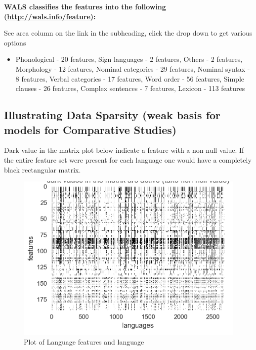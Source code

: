 \newpage

\textbf{WALS classifies the features into the following (\url{http://wals.info/feature}):}

See area column on the link in the subheading, click the drop down to get various options

\begin{itemize}
\item Phonological - 20 features, Sign languages - 2 features, Others - 2 features, Morphology - 12 features, Nominal categories - 29 features, Nominal syntax - 8 features, Verbal categories - 17 features, Word order - 56 features, Simple clauses - 26 features, Complex sentences - 7 features, Lexicon - 113 features

\end{itemize}


\subsection*{Illustrating Data Sparsity (weak basis for models for Comparative Studies)}

Dark value in the matrix plot below indicate a feature with a non null value. If the entire feature set were present for each language one would have a completely black rectangular matrix.

\begin{figure}[!hbp]
\includegraphics[scale=0.29]{"images/6_02.jpg"}
\caption{Plot of Language features and language}\label{art6-fig02}
\end{figure}

\newpage

